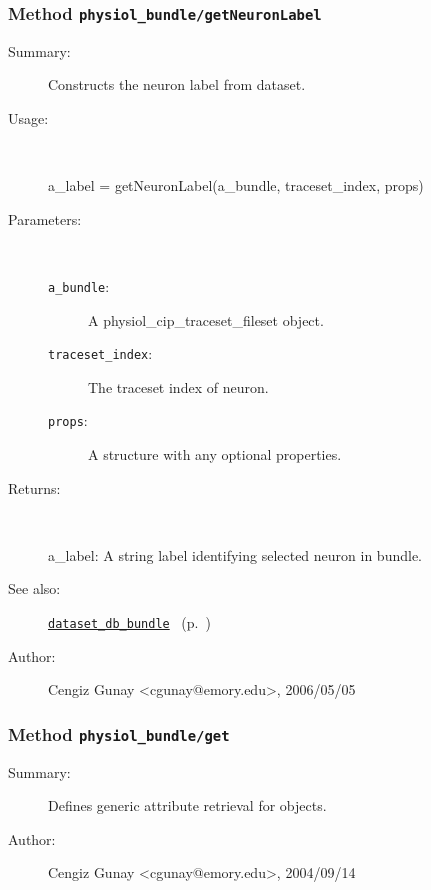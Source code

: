 \subsubsection[Method \texttt{getNeuronLabel}]{Method \texttt{physiol\_bundle/getNeuronLabel}}%
%
\label{ref_physiol_bundle__getNeuronLabel}%
\hypertarget{ref_physiol_bundle__getNeuronLabel}{}%
\begin{description}
\item[Summary:]Constructs the neuron label from dataset.
%
\item[Usage:]~%
\begin{lyxcode}%
a\_label = getNeuronLabel(a\_bundle, traceset\_index, props)
%
\end{lyxcode}%
%
%
\item[Parameters:]~
\begin{description}%
\item[\texttt{a\_bundle}:]
 A physiol\_cip\_traceset\_fileset object.
\item[\texttt{traceset\_index}:]
 The traceset index of neuron.
\item[\texttt{props}:]
 A structure with any optional properties.
\end{description}%
%
\item[Returns:]~

	a\_label: A string label identifying selected neuron in bundle.
%
%
\item[See also:]%
\hyperlink{ref_dataset_db_bundle}{\texttt{dataset\_db\_bundle}}%
\ (p.~\pageref{ref_dataset_db_bundle})%
%
%
\item[Author:]%
Cengiz Gunay <cgunay@emory.edu>, 2006/05/05%
\end{description}
\methodline%
\subsubsection[Method \texttt{get}]{Method \texttt{physiol\_bundle/get}}%
%
\label{ref_physiol_bundle__get}%
\hypertarget{ref_physiol_bundle__get}{}%
\begin{description}
\item[Summary:]Defines generic attribute retrieval for objects.
%
%
%
%
%
%
%
\item[Author:]%
Cengiz Gunay <cgunay@emory.edu>, 2004/09/14%
\end{description}
\methodline%
